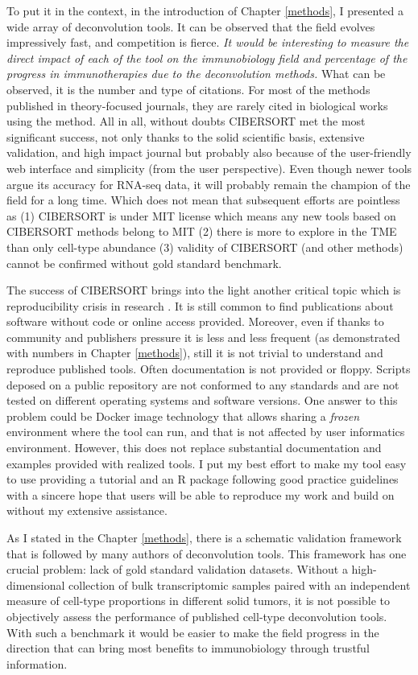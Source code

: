 \documentclass[12pt,]{book}
\theoremstyle{definition}
\theoremstyle{definition}
\theoremstyle{definition}
\theoremstyle{remark}
\begin{document}
To put it in the context, in the introduction of Chapter \ref{methods},
I presented a wide array of deconvolution tools. It can be observed that
the field evolves impressively fast, and competition is fierce. \emph{It
would be interesting to measure the direct impact of each of the tool on
the immunobiology field and percentage of the progress in
immunotherapies due to the deconvolution methods.} What can be observed,
it is the number and type of citations. For most of the methods
published in theory-focused journals, they are rarely cited in
biological works using the method. All in all, without doubts CIBERSORT
met the most significant success, not only thanks to the solid
scientific basis, extensive validation, and high impact journal but
probably also because of the user-friendly web interface and simplicity
(from the user perspective). Even though newer tools argue its accuracy
for RNA-seq data, it will probably remain the champion of the field for
a long time. Which does not mean that subsequent efforts are pointless
as (1) CIBERSORT is under MIT license which means any new tools based on
CIBERSORT methods belong to MIT (2) there is more to explore in the TME
than only cell-type abundance (3) validity of CIBERSORT (and other
methods) cannot be confirmed without gold standard benchmark.

The success of CIBERSORT brings into the light another critical topic
which is reproducibility crisis in research \citep{Fanelli2018}. It is
still common to find publications about software without code or online
access provided. Moreover, even if thanks to community and publishers
pressure it is less and less frequent (as demonstrated with numbers in
Chapter \ref{methods}), still it is not trivial to understand and
reproduce published tools. Often documentation is not provided or
floppy. Scripts deposed on a public repository are not conformed to any
standards and are not tested on different operating systems and software
versions. One answer to this problem could be Docker image technology
that allows sharing a \emph{frozen} environment where the tool can run,
and that is not affected by user informatics environment. However, this
does not replace substantial documentation and examples provided with
realized tools. I put my best effort to make my tool easy to use
providing a tutorial and an R package following good practice guidelines
with a sincere hope that users will be able to reproduce my work and
build on without my extensive assistance.

As I stated in the Chapter \ref{methods}, there is a schematic
validation framework that is followed by many authors of deconvolution
tools. This framework has one crucial problem: lack of gold standard
validation datasets. Without a high-dimensional collection of bulk
transcriptomic samples paired with an independent measure of cell-type
proportions in different solid tumors, it is not possible to objectively
assess the performance of published cell-type deconvolution tools. With
such a benchmark it would be easier to make the field progress in the
direction that can bring most benefits to immunobiology through trustful
information.
\end{document}
